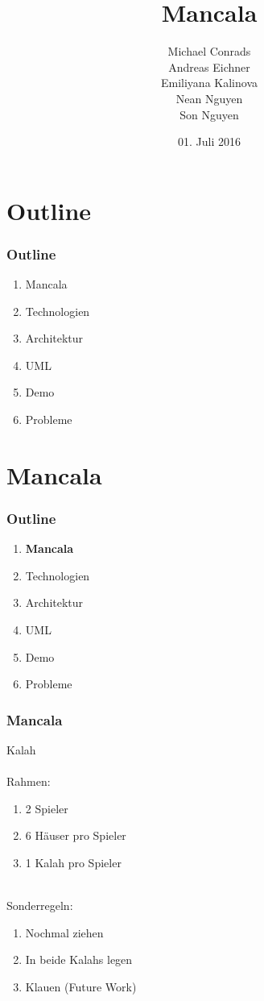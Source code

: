 \documentclass[
	10pt,
	t		%
]{beamer}
\title{Mancala}
\subtitle{}
\author{Michael Conrads \\ Andreas Eichner \\ Emiliyana Kalinova \\ Nean Nguyen \\ Son Nguyen}
\date{01. Juli 2016}
\begin{document}
\AddToShipoutPicture{\TitlePicture}
\maketitle
\ClearShipoutPicture
\AddToShipoutPicture{\BackgroundPicture}

\section{Outline}
\begin{frame}
\frametitle{Outline}
\begin{enumerate}
\item Mancala
\item Technologien
\item Architektur
\item UML
\item Demo
\item Probleme
\end{enumerate}
\end{frame}

\section{Mancala}
\begin{frame}
\frametitle{Outline}
\begin{enumerate}
\item \textbf{Mancala}
\item Technologien
\item Architektur
\item UML
\item Demo
\item Probleme
\end{enumerate}
\end{frame}

\begin{frame}
\frametitle{Mancala}
Kalah\\[0.2cm]
\hfill \\
Rahmen:
\begin{enumerate}
	\item 2 Spieler
	\item 6 H\"auser pro Spieler
	\item 1 Kalah pro Spieler
\end{enumerate}
\hfill \\[0.4cm]
Sonderregeln:
\begin{enumerate}
	\item Nochmal ziehen
	\item In beide Kalahs legen
	\item Klauen (Future Work)
\end{enumerate}
\end{frame}
\end{document}
